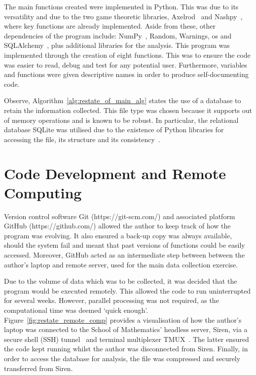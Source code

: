 The main functions created were implemented in Python. This was due to its
versatility and due to the two game theoretic libraries, Axelrod~\cite{axelrodproject}
and Nashpy~\cite{Nashpy2019}, where key functions are already implemented. Aside from these,
other dependencies of the program include: NumPy~\cite{Walt2011}, Random, Warnings, os and
SQLAlchemy~\cite{Bayer2012}, plus additional libraries for the analysis. This
program was implemented through the creation of eight functions. This was to ensure the
code was easier to read, debug and test for any potential user.
Furthermore, variables and functions were given descriptive names in order to
produce self-documenting code.

\newpage
Observe, Algorithm~\ref{alg:restate_of_main_alg} states the use of a database to
retain the information collected. This file type was chosen because it supports
out of memory operations and is known to be robust. In particular, the
relational database SQLite was utilised due to the existence of Python libraries
for accessing the file, its structure and its consistency~\cite{Codd2002,ostezer2019}.

\section{Code Development and Remote Computing}
Version control software Git (https://git-scm.com/) and associated platform
GitHub (https://github.com/) allowed the author
to keep track of how the program was evolving. It also ensured a back-up copy
was always available, should the system fail and meant that past versions of
functions could be easily accessed. Moreover, GitHub acted as an intermediate
step between between the author's laptop and remote server, used for the main
data collection exercise. 

Due to the volume of data which was to be collected, it was decided that the
program would be executed remotely. This allowed the code to run uninterrupted
for several weeks. However, parallel processing was not required, as the
computational time was deemed `quick enough'.
Figure~\ref{fig:restate_remote_comp} provides a visualisation of how the
author's laptop was connected to the School of Mathematics' headless server,
Siren, via a secure shell (SSH) tunnel~\cite{SSH.COM2016} and terminal multiplexer TMUX~\cite{Marriott}. The latter
ensured the code kept running whilst the author was disconnected from Siren.
Finally, in order to access the database for analysis, the file was compressed
and securely transferred from Siren.


